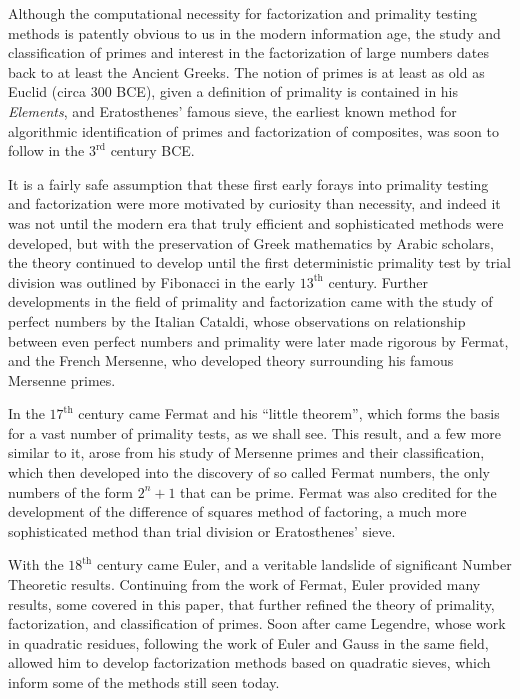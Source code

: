 \documentclass{article}
\begin{document}
\par Although the computational necessity for factorization and primality testing methods is patently obvious to us in the modern 
information age, the study and classification of primes and interest in the factorization of large numbers dates back to at least the Ancient Greeks. The notion of primes is at least as old as Euclid (circa 300 BCE), given a definition of primality is contained in his \textit{ Elements}, %
and Eratosthenes' famous sieve, the earliest known method for algorithmic identification of primes and factorization of composites, was soon to follow in the $3^{\text{rd}}$ century BCE. 
\par It is a fairly safe assumption that these first early forays into primality testing and factorization were more motivated by curiosity than necessity, and indeed it was not until the modern era that truly efficient and sophisticated methods were developed, but with the preservation of Greek mathematics by Arabic scholars, the theory continued to develop until the first deterministic primality test by trial division was outlined by Fibonacci in the early $13^{\text{th}}$ century. Further developments in the field of primality and factorization came with the study of perfect numbers by the Italian Cataldi, whose observations on relationship between even perfect numbers and primality were later made rigorous by Fermat, and the French Mersenne, who developed theory surrounding his famous Mersenne primes.
\par In the $17^{\text{th}}$ century came Fermat and his ``little theorem'', which forms the basis for a vast number of primality tests, as we shall see. This result, and a few more similar to it, arose from his study of Mersenne primes and their classification, which then developed into the discovery of so called Fermat numbers, the only numbers of the form $2^n + 1$ that can be prime. Fermat was also credited for the development of the difference of squares method of factoring, a much more sophisticated method than trial division or Eratosthenes' sieve.
\par With the $18^{\text{th}}$ century came Euler, and a veritable landslide of significant Number Theoretic results. Continuing from the work of Fermat, Euler provided many results, some covered in this paper, that further refined the theory of primality, factorization, and classification of primes. Soon after came Legendre, whose work in quadratic residues, following the work of Euler and Gauss in the same field, allowed him to develop factorization methods based on quadratic sieves, which inform some of the methods still seen today.
\end{document}
